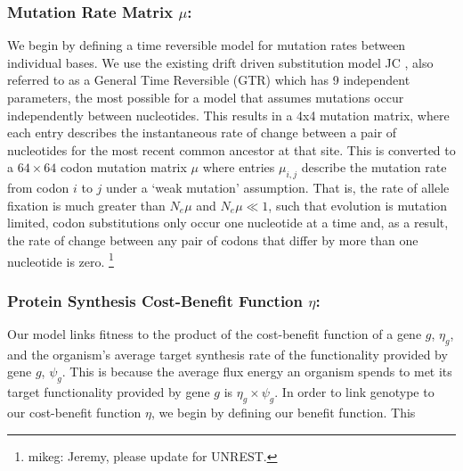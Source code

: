 \documentclass{article}
\newcommand{\Nemu}{\ensuremath{{N_e \mu}}\xspace} %
\newcommand{\etag}{\ensuremath{\eta_g}\xspace}
\newcommand{\muij}{\ensuremath{\mu_{i,j}}\xspace}
\newcommand{\psig}{\ensuremath{\psi_{g}}\xspace}
\begin{document}
\subsubsection*{Mutation Rate Matrix $\mu$: }
We begin by defining a time reversible model for mutation rates between individual bases.
We use the existing drift driven substitution model JC \citep{JukesAndCantor1969}, also referred to as a General Time Reversible (GTR) \citep{Tavare1986,Yang2014} which has 9 independent parameters, the most possible for a model that assumes mutations occur independently between nucleotides.
This results in a 4x4 mutation matrix, where each entry describes the instantaneous rate of change between a pair of nucleotides for the most recent common ancestor at that site.
This is converted to a $64 \times 64$ codon mutation matrix $\mu$ where entries $\muij$ describe the mutation rate from codon $i$ to $j$ under a `weak mutation' assumption.
That is, the rate of allele fixation is much greater than \Nemu and $\Nemu \ll 1$, such that evolution is mutation limited, codon substitutions only occur one nucleotide at a time and, as a result,  the rate of change between any pair of codons that differ by more than one nucleotide is zero.
\footnote{mikeg: Jeremy, please update for UNREST.}

\subsubsection*{Protein Synthesis Cost-Benefit Function $\eta$: }
Our model links fitness to the product of the cost-benefit function of a gene $g$, $\etag$, and the organism's average target synthesis rate of the functionality provided by gene $g$, $\psig$.
This is because the average flux energy an organism spends to met its target functionality provided by gene $g$ is $\etag \times \psig$.
In order to link genotype to our cost-benefit function $\eta$, we begin by defining our benefit function.
This
\end{document}
